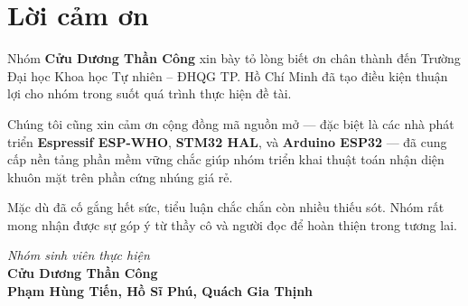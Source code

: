 \chapter*{Lời cảm ơn}
\thispagestyle{plain}

\begin{singlespace}
Nhóm \textbf{Cửu Dương Thần Công} xin bày tỏ lòng biết ơn chân thành đến Trường Đại học Khoa học Tự nhiên -- ĐHQG TP. Hồ Chí Minh đã tạo điều kiện thuận lợi cho nhóm trong suốt quá trình thực hiện đề tài.

Chúng tôi cũng xin cảm ơn cộng đồng mã nguồn mở --- đặc biệt là các nhà phát triển \textbf{Espressif ESP-WHO}, \textbf{STM32 HAL}, và \textbf{Arduino ESP32} --- đã cung cấp nền tảng phần mềm vững chắc giúp nhóm triển khai thuật toán nhận diện khuôn mặt trên phần cứng nhúng giá rẻ.

Mặc dù đã cố gắng hết sức, tiểu luận chắc chắn còn nhiều thiếu sót. Nhóm rất mong nhận được sự góp ý từ thầy cô và người đọc để hoàn thiện trong tương lai.
\end{singlespace}

\vspace{1.5cm}
\begin{flushright}
  \textit{Nhóm sinh viên thực hiện}\\[0.3cm]
  \textbf{Cửu Dương Thần Công}\\[0.25cm]
  \textbf{Phạm Hùng Tiến, Hồ Sĩ Phú, Quách Gia Thịnh}
\end{flushright}
